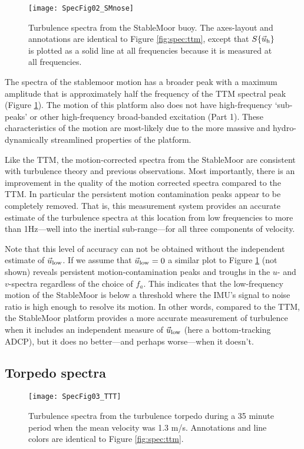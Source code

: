 \begin{figure*}[th]
  \centering
  \texttt{[image: SpecFig02\_SMnose]}
  \caption{Turbulence spectra from the StableMoor buoy. The axes-layout and annotations are identical to Figure \ref{fig:spec:ttm}, except that $S\{\vec{u}_\mathrm{h}\}$ is plotted as a solid line at all frequencies because it is measured at all frequencies. }
  \label{fig:spec:sm}
\end{figure*}

The spectra of the stablemoor motion has a broader peak with a maximum amplitude that is approximately half the frequency of the TTM spectral peak (Figure \ref{fig:spec:sm}). The motion of this platform also does not have high-frequency `sub-peaks' or other high-frequency broad-banded excitation (Part 1).  These characteristics of the motion are most-likely due to the more massive and hydro-dynamically streamlined properties of the platform. 

Like the TTM, the motion-corrected spectra from the StableMoor are consistent with turbulence theory and previous observations. Most importantly, there is an improvement in the quality of the motion corrected spectra compared to the TTM. In particular the persistent motion contamination peaks appear to be completely removed. That is, this measurement system provides an accurate estimate of the turbulence spectra at this location from low frequencies to more than 1Hz---well into the inertial sub-range---for all three components of velocity.

Note that this level of accuracy can not be obtained without the independent estimate of $\vec{u}_\mathrm{low}$. If we assume that $\vec{u}_\mathrm{low}=0$ a similar plot to Figure \ref{fig:spec:sm} (not shown) reveals persistent motion-contamination peaks and troughs in the $u$- and $v$-spectra regardless of the choice of $f_a$. This indicates that the low-frequency motion of the StableMoor is below a threshold where the IMU's signal to noise ratio is high enough to resolve its motion. In other words, compared to the TTM, the StableMoor platform provides a more accurate measurement of turbulence when it includes an independent measure of $\vec{u}_\mathrm{low}$ (here a bottom-tracking ADCP), but it does no better---and perhaps worse---when it doesn't.

\subsection{Torpedo spectra}

\begin{figure}[t]
  \centering
  \texttt{[image: SpecFig03\_TTT]}
  \caption{Turbulence spectra from the turbulence torpedo during a 35 minute period when the mean velocity was 1.3 m/s. Annotations and line colors are identical to Figure \ref{fig:spec:ttm}.}
  \label{fig:spec:torpedo}
\end{figure}

